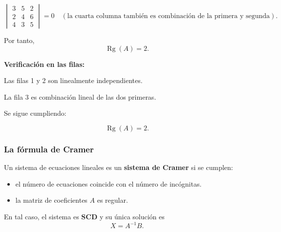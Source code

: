 \documentclass[a4paper,12pt]{article}
\begin{document}
\begin{ejemplo}
\[
\begin{vmatrix}
3 & 5 & 2 \\
2 & 4 & 6 \\
4 & 3 & 5
\end{vmatrix}
= 0
\quad
(\text{la cuarta columna también es combinación de la primera y segunda}).
\]

Por tanto,
\[
\operatorname{Rg}(A)=2.
\]

\textbf{Verificación en las filas:}

Las filas 1 y 2 son linealmente independientes.

La fila 3 es combinación lineal de las dos primeras.

\vspace{0.5em}

Se sigue cumpliendo:

\[
\operatorname{Rg}(A)=2.
\]
\end{ejemplo}

\subsubsection{La fórmula de Cramer}

\begin{procedimiento}[title=Sistemas de Cramer]
Un sistema de ecuaciones lineales es un \textbf{sistema de Cramer} si se cumplen:
\begin{itemize}
    \item el número de ecuaciones coincide con el número de incógnitas.
    \item la matriz de coeficientes $A$ es regular.
\end{itemize}

En tal caso, el sistema es \textbf{SCD} y su única solución es
\[
X = A^{-1} B.
\]

\end{procedimiento}
\end{document}
